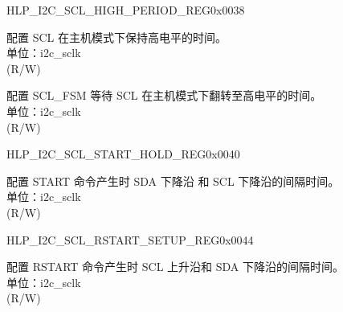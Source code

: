 \begin{register}{H}{LP\_I2C\_SCL\_HIGH\_PERIOD\_REG}{0x0038}\label{regdesc:LPI2CSCLHIGHPERIODREG}
%
%
%
\regnewline%
\begin{regdesc}\begin{reglist}
\label{fielddesc:LPI2CSCLHIGHPERIOD}\item [LP\_I2C\_SCL\_HIGH\_PERIOD] 配置 SCL 在主机模式下保持高电平的时间。\\
单位：i2c\_sclk \\ (R/W)
\label{fielddesc:LPI2CSCLWAITHIGHPERIOD}\item [LP\_I2C\_SCL\_WAIT\_HIGH\_PERIOD] 配置 SCL\_FSM 等待 SCL 在主机模式下翻转至高电平的时间。\\
单位：i2c\_sclk \\ (R/W)
\end{reglist}\end{regdesc}
\end{register}


\begin{register}{H}{LP\_I2C\_SCL\_START\_HOLD\_REG}{0x0040}\label{regdesc:LPI2CSCLSTARTHOLDREG}
%
%
\regnewline%
\begin{regdesc}\begin{reglist}
\label{fielddesc:LPI2CSCLSTARTHOLDTIME}\item [LP\_I2C\_SCL\_START\_HOLD\_TIME] 配置 START 命令产生时 SDA 下降沿 和 SCL 下降沿的间隔时间。\\
单位：i2c\_sclk \\ (R/W)
\end{reglist}\end{regdesc}
\end{register}


\begin{register}{H}{LP\_I2C\_SCL\_RSTART\_SETUP\_REG}{0x0044}\label{regdesc:LPI2CSCLRSTARTSETUPREG}
%
%
\regnewline%
\begin{regdesc}\begin{reglist}
\label{fielddesc:LPI2CSCLRSTARTSETUPTIME}\item [LP\_I2C\_SCL\_RSTART\_SETUP\_TIME] 配置 RSTART 命令产生时 SCL 上升沿和 SDA 下降沿的间隔时间。\\
单位：i2c\_sclk \\ (R/W)
\end{reglist}\end{regdesc}
\end{register}


